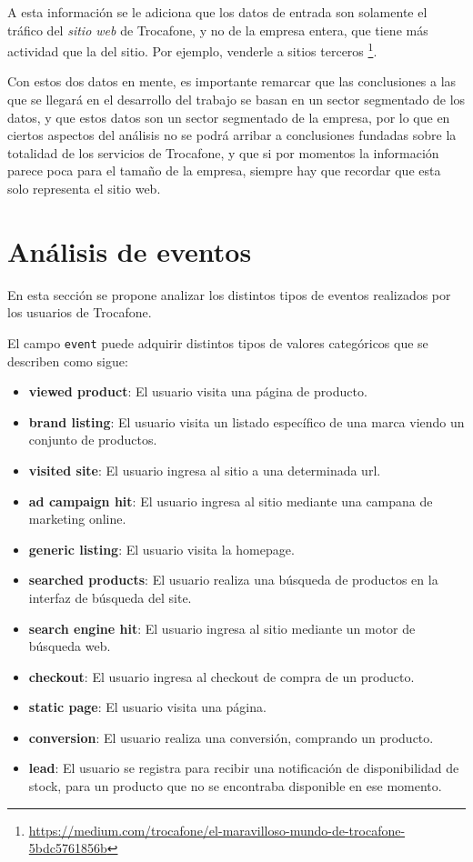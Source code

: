 \documentclass[a4paper]{article}
\begin{document}
A esta información se le adiciona que los datos de entrada son solamente el tráfico del \textit{sitio web} de Trocafone, y no de la empresa entera, que tiene más actividad que la del sitio. Por ejemplo, venderle a sitios terceros \footnote{\url{https://medium.com/trocafone/el-maravilloso-mundo-de-trocafone-5bdc5761856b}}.

Con estos dos datos en mente, es importante remarcar que las conclusiones a las que se llegará en el desarrollo del trabajo se basan en un sector segmentado de los datos, y que estos datos son un sector segmentado de la empresa, por lo que en ciertos aspectos del análisis no se podrá arribar a conclusiones fundadas sobre la totalidad de los servicios de Trocafone, y que si por momentos la información parece poca para el tamaño de la empresa, siempre hay que recordar que esta solo representa el sitio web.

\section{Análisis de eventos}

En esta sección se propone analizar los distintos tipos de eventos realizados por los usuarios de Trocafone. 

El campo \texttt{event} puede adquirir distintos tipos de valores categóricos que se describen como sigue:

\begin{itemize}
	\item \textbf{viewed product}: El usuario visita una página de producto.
	\item \textbf{brand listing}: El usuario visita un listado específico de una marca viendo un conjunto de productos.
	\item \textbf{visited site}:  El usuario ingresa al sitio a una determinada url.
	\item \textbf{ad campaign hit}: El usuario ingresa al sitio mediante una campana de marketing online.
	\item \textbf{generic listing}: El usuario visita la homepage.
	\item \textbf{searched products}: El usuario realiza una búsqueda de productos en la interfaz de búsqueda del site.
	\item \textbf{search engine hit}: El usuario ingresa al sitio mediante un motor de búsqueda web.
	\item \textbf{checkout}: El usuario ingresa al checkout de compra de un producto.
	\item \textbf{static page}:  El usuario visita una página.
	\item \textbf{conversion}: El usuario realiza una conversión, comprando un producto.
	\item \textbf{lead}: El usuario se registra para recibir una notificación de disponibilidad de stock, para un producto que no se encontraba disponible en ese momento.					
\end{itemize}
\end{document}
